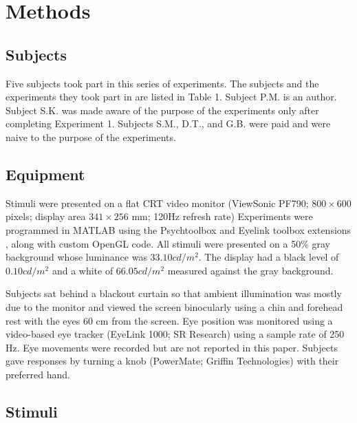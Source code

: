 \documentclass[11pt]{amsart}
\begin{document}
\section{Methods}

\subsection{Subjects}

Five subjects took part in this series of experiments. The subjects
and the experiments they took part in are listed in Table 1. Subject
P.M. is an author. Subject S.K. was made aware of the purpose of the
experiments only after completing Experiment 1. Subjects S.M., D.T.,
and G.B. were paid and were naive to the purpose of the experiments.

\subsection{Equipment}

Stimuli were presented on a flat CRT video monitor (ViewSonic PF790;
$800 \times 600$ pixels; display area $341 \times 256$ mm; 120Hz
refresh rate) Experiments were programmed in MATLAB using the
Psychtoolbox \cite{Brainard:1997gq} and Eyelink toolbox extensions
\cite{Cornelissen:2002wl}, along with custom OpenGL code. All stimuli
were presented on a 50\% gray background whose luminance was $33.10
cd/m^2$. The display had a black level of $0.10 cd/m^2$ and a white of
$66.05 cd/m^2$ measured against the gray background.

Subjects sat behind a blackout curtain so that ambient illumination
was mostly due to the monitor and viewed the screen binocularly using
a chin and forehead rest with the eyes 60 cm from the screen. Eye
position was monitored using a video-based eye tracker (EyeLink 1000;
SR Research) using a sample rate of 250 Hz. Eye movements were
recorded but are not reported in this paper. Subjects gave responses
by turning a knob (PowerMate; Griffin Technologies) with their
preferred hand.

\subsection{Stimuli}
\end{document}
